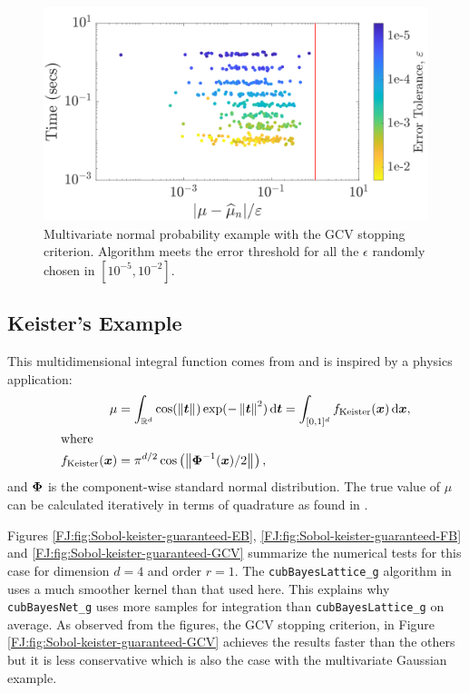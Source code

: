 \documentclass[graybox,footinfo]{svmult}
\newcommand{\norm}[2][{}]{\ensuremath{\left \lVert #2 \right \rVert}_{#1}}
\newcommand{\FJHNote}[1]{{\textcolor{blue}{FJH: #1}}}
\newcommand{\JRNote}[1]{{\textcolor{green}{JR: #1}}}
\begin{document}
\begin{figure}
\centering
\includegraphics[width=0.95\linewidth]{"figures/Sobol/Sobol_MVN_guaranteed_time_GCV__d2_r1_2019-Sep-1"}
\caption[Sobol: MVN guaranteed: GCV]{Multivariate normal probability example with the GCV stopping criterion. Algorithm meets the error threshold for all the $\epsilon$ randomly chosen in $[10^{-5}, 10^{-2}]$.}
\label{FJ:fig:Sobol-mvn-guaranteed-GCV}
\end{figure}






\subsection{Keister's Example}

This multidimensional integral function comes from \cite{Kei96} and is inspired by a physics application:
\begin{align}
\label{FJ:eqn:keister_integral}
\mu  &=  \int_{\R^d} \cos(\norm{ \bst}) \exp(-\norm{ \bst }^2) \, \textup{d}\bst 
 = \int_{[0,1]^d} f_{\textup{Keister}}(\bsx) \, \textup{d}\bsx,\\
\intertext{where }
\nonumber
f_\textup{Keister}(\bsx) &= \pi^{d/2} \cos\left(\norm{ \bsPhi^{-1}(\bsx)/2}\right)  ,
\end{align}
and ${\boldsymbol{\Phi}}$ is the component-wise standard normal distribution.
The true value of $\mu$ can be calculated iteratively in terms of  quadrature as found in \cite[Section 5.2]{RatHic19a}.


Figures \ref{FJ:fig:Sobol-keister-guaranteed-EB}, \ref{FJ:fig:Sobol-keister-guaranteed-FB} and \ref{FJ:fig:Sobol-keister-guaranteed-GCV} summarize the numerical tests for this case for dimension $d=4$ and order $r=1$.  The \texttt{cubBayesLattice\_g} algorithm in  \cite{RatHic19a} uses a much smoother kernel than that used here. This explains why \texttt{cubBayesNet\_g} uses more samples for integration than  \texttt{cubBayesLattice\_g} on average. 
As observed from the figures, the GCV stopping criterion, in Figure \ref{FJ:fig:Sobol-keister-guaranteed-GCV} achieves the results faster than the others but it is less conservative which is also the case with the multivariate Gaussian example.
\end{document}
